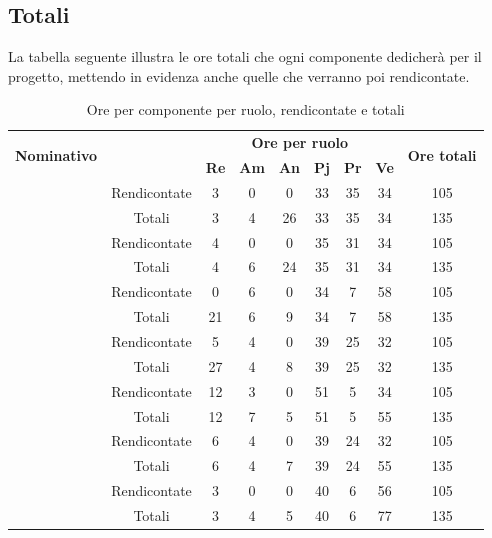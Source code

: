 \subsection{Totali}
La tabella seguente illustra le ore totali che ogni componente dedicherà per il progetto, mettendo in evidenza anche quelle che verranno poi rendicontate.
\begin{table}[H]
	\begin{center}
		\begin{tabular}{|c|c|c|c|c|c|c|c|c|}
			\hline
			\multirow{2}{*}{\textbf{Nominativo}} & & \multicolumn{6}{c|}{\textbf{Ore per ruolo}} & \multirow{2}{*}{\textbf{Ore totali}} \\
			& & \textbf{Re} & \textbf{Am} & \textbf{An} & \textbf{Pj} & \textbf{Pr} & \textbf{Ve} & \\
			\hline
			\hline
			\multirow{2}{*}{\FB}		&	Rendicontate	&	3	&	0	&	0	&	33	&	35	& 34 	&	105	\\
			\cline{2-9}
			&	Totali			&	3	&	4	&	26	&	33	&	35	& 	34	&	135	\\
			\hline	
			\hline
			\multirow{2}{*}{\AF}	&	Rendicontate	&	4	&	0	&	0	&	35	&	31	&  34	&	105	\\
			\cline{2-9}
			&	Totali			&	4	&	6	&	24	&	35	&	31	& 	34	&	135	\\
			\hline
			\hline
			\multirow{2}{*}{\GN}	&	Rendicontate	&	0	&	6	&	0	&	34	&	7	&	58	&	105	\\
			\cline{2-9}
			&	Totali			&	21	&	6	&	9	&	34	&	7	&	58	&	135	\\
			\hline
			\hline					
			\multirow{2}{*}{\GR}	&	Rendicontate	&	5	&	4	&	0	&	39	&	25	&	32	&	105	\\
			\cline{2-9}
			&	Totali			&	27	&	4	&	8	&	39	&	25	&	32	&	135	\\
			\hline
			\hline
			\multirow{2}{*}{\SM}		&	Rendicontate	&	12	&	3	&	0	&	51	&	5	& 	34	&	105	\\
			\cline{2-9}
			&	Totali			&	12	&	7	&	5	&	51	&	5	& 	55	&	135	\\
			\hline			
			\hline
			\multirow{2}{*}{\MP}	&	Rendicontate	&	6	&	4	&	0	&	39	&	24	& 	32	&	105	\\
			\cline{2-9}
			&	Totali			&	6	&	4	&	7	&	39	&	24	& 	55	&	135	\\
			\hline
			\hline			
			\multirow{2}{*}{\MV}	&	Rendicontate	&	3	&	0	&	0	&	40	&	6	& 	56	&	105	\\
			\cline{2-9}
			&	Totali			&	3	&	4	&	5	&	40	&	6	& 	77	&	135	\\
			\hline
		\end{tabular}
	\end{center}
	\caption{Ore per componente per ruolo, rendicontate e totali}
\end{table}
